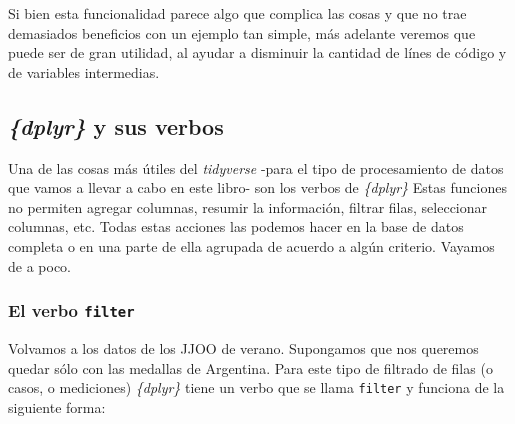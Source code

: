 \documentclass[
  letterpaper,
  DIV=11,
  numbers=noendperiod,
  oneside]{scrreprt}
\begin{document}
Si bien esta funcionalidad parece algo que complica las cosas y que no
trae demasiados beneficios con un ejemplo tan simple, más adelante
veremos que puede ser de gran utilidad, al ayudar a disminuir la
cantidad de línes de código y de variables intermedias.

\hypertarget{dplyr-y-sus-verbos}{%
\subsection{\texorpdfstring{\emph{\{dplyr\}} y sus
verbos}{\{dplyr\} y sus verbos}}\label{dplyr-y-sus-verbos}}

Una de las cosas más útiles del \emph{tidyverse} -para el tipo de
procesamiento de datos que vamos a llevar a cabo en este libro- son los
verbos de \emph{\{dplyr\}} Estas funciones no permiten agregar columnas,
resumir la información, filtrar filas, seleccionar columnas,
etc. Todas
estas acciones las podemos hacer en la base de datos completa o en una
parte de ella agrupada de acuerdo a algún criterio. Vayamos de a poco.

\hypertarget{el-verbo-filter}{%
\subsubsection{\texorpdfstring{El verbo
\texttt{filter}}{El verbo filter}}\label{el-verbo-filter}}

Volvamos a los datos de los JJOO de verano. Supongamos que nos queremos
quedar sólo con las medallas de Argentina. Para este tipo de filtrado de
filas (o casos, o mediciones) \emph{\{dplyr\}} tiene un verbo que se
llama \texttt{filter} y funciona de la siguiente forma:
\end{document}
